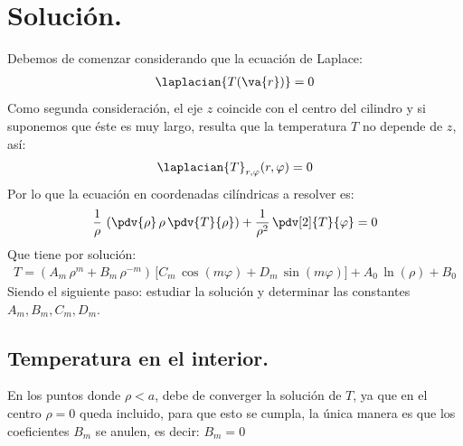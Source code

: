 \section{Solución.}
Debemos de comenzar considerando que la ecuación de Laplace:
\begin{align*}
\laplacian{T(\va{r})} = 0
\end{align*}
Como segunda consideración, el eje $z$ coincide con el centro del cilindro y si suponemos que éste es muy largo, resulta que la temperatura $T$ no depende de $z$, así:
\begin{align*}
\laplacian{T}_{r,\varphi} (r, \varphi) = 0
\end{align*}
Por lo que la ecuación en coordenadas cilíndricas a resolver es:
\begin{align*}
\dfrac{1}{\rho} \, \left( \pdv{\rho} \, \rho \, \pdv{T}{\rho} \right) + \dfrac{1}{\rho^{2}} \, \pdv[2]{T}{\varphi} = 0
\end{align*}
Que tiene por solución:
\begin{align*}
T = \left( A_{m} \, \rho^{m} + B_{m} \, \rho^{-m} \right) \, \big[ C_{m} \, \cos (m \varphi) + D_{m} \, \sin (m \varphi) \big] + A_{0} \,\ln (\rho) + B_{0}
\end{align*}
Siendo el siguiente paso: estudiar la solución y determinar las constantes $A_{m}, B_{m}, C_{m}, D_{m}$.

\subsection{Temperatura en el interior.}
En los puntos donde $\rho < a$, debe de converger la solución de $T$, ya que en el centro $\rho = 0$ queda incluido, para que esto se cumpla, la única manera es que los coeficientes $B_{m}$ se anulen, es decir: $B_{m} = 0$
